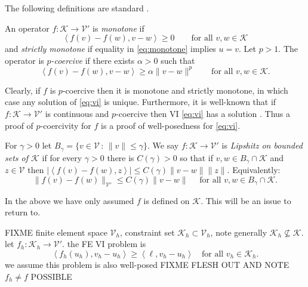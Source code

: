 \documentclass[hidelinks,onefignum,onetabnum,final]{siamart220329}  %
\newcommand{\cK}{\mathcal{K}}
\newcommand{\cV}{\mathcal{V}}
\newcommand{\ip}[2]{\left<#1,#2\right>}
\begin{document}
The following definitions are standard \cite[for example]{KinderlehrerStampacchia1980}.

\begin{definition}  An operator $f:\cK \to \cV'$ is \emph{monotone} if
\begin{equation}
\ip{f(v)-f(w)}{v-w} \ge 0 \qquad \text{for all } v,w \in \cK \label{eq:monotone}
\end{equation}
and \emph{strictly monotone} if equality in \eqref{eq:monotone} implies $u=v$.  Let $p>1$.  The operator is \emph{$p$-coercive} if there exists $\alpha>0$ such that
\begin{equation}
\ip{f(v)-f(w)}{v-w} \ge \alpha \|v-w\|^p \qquad \text{for all } v,w \in \cK. \label{eq:pcoercive}
\end{equation}
\end{definition}

Clearly, if $f$ is $p$-coercive then it is monotone and strictly monotone, in which case any solution of \eqref{eq:vi} is unique.  Furthermore, it is well-known that if $f:\cK \to \cV'$ is continuous and $p$-coercive then VI \eqref{eq:vi} has a solution \cite[Corollary III.1.8]{KinderlehrerStampacchia1980}.  Thus a proof of $p$-coercivity for $f$ is a proof of well-posedness for \eqref{eq:vi}.


\begin{definition}  For $\gamma>0$ let $B_\gamma = \{v\in \cV\,:\,\|v\|\le \gamma\}$.  We say $f:\cK \to \cV'$ is \emph{Lipshitz on bounded sets of $\cK$} if for every $\gamma>0$ there is $C(\gamma)>0$ so that if $v,w \in B_\gamma \cap \cK$ and $z\in\cV$ then $|\ip{f(v)-f(w)}{z}| \le C(\gamma) \|v-w\| \|z\|$.  Equivalently:
\begin{equation}
\|f(v)-f(w)\|_{\cV'} \le C(\gamma) \|v-w\| \quad \text{ for all } v,w \in B_\gamma \cap \cK.  \label{eq:continuousonbounded}
\end{equation}
\end{definition}

In the above we have only assumed $f$ is defined on $\cK$.  This will be an issue to return to.

FIXME finite element space $\cV_h$, constraint set $\cK_h\subset \cV_h$, note generally $\cK_h \nsubseteq \cK$.  let $f_h:\cK_h\to\cV'$.  the FE VI problem is
\begin{equation}
\ip{f_h(u_h)}{v_h-u_h} \ge \ip{\ell}{v_h-u_h} \quad \text{for all } v_h\in \cK_h. \label{eq:fe:vi}
\end{equation}
we assume this problem is also well-posed FIXME FLESH OUT AND NOTE $f_h\ne f$ POSSIBLE
\end{document}
